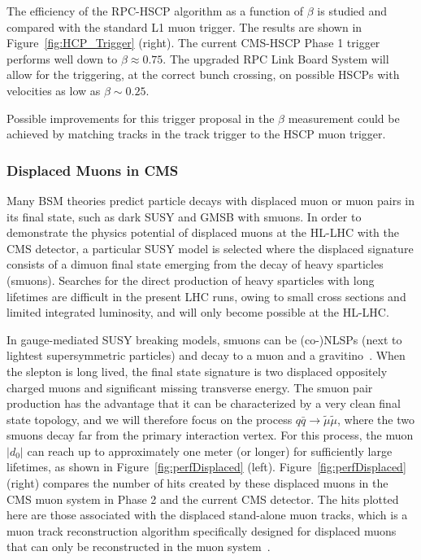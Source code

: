 The efficiency of the RPC-HSCP algorithm as a function of $\beta$ is studied and compared with the standard L1 muon trigger. The results are shown in Figure~\ref{fig:HCP_Trigger} (right). The current CMS-HSCP Phase 1 trigger performs well down to $\beta \approx 0.75$. The upgraded RPC Link Board System will allow for the triggering, at the
correct bunch crossing, on possible HSCPs with velocities as low as $\beta \sim 0.25$.

Possible improvements for this trigger proposal in the $\beta$ measurement could be achieved by matching tracks in the track trigger to the HSCP muon trigger.

\subsubsection{Displaced Muons in CMS}


Many BSM theories predict particle decays with displaced muon or muon pairs in its final state, such as dark SUSY and GMSB with smuons.
In order to demonstrate the physics potential of displaced muons at the HL-LHC with the CMS detector,
a particular SUSY model is selected where the displaced signature consists of a dimuon final state emerging from the decay of heavy sparticles (smuons).
Searches for the direct production of heavy sparticles with long lifetimes are difficult in the present LHC runs,
owing to small cross sections and limited integrated luminosity, and will only become possible at the HL-LHC.

In gauge-mediated SUSY breaking models, smuons can be (co-)NLSPs (next to lightest supersymmetric particles) and decay to a muon and a gravitino~\cite{Ruderman:2010kj}.
When the slepton is long lived, the final state signature is two displaced oppositely charged muons and significant missing transverse energy.
The smuon pair production has the advantage that it can be characterized by a very clean final state topology, and
we will therefore focus on the process $q \bar q \to \widetilde{\mu} \widetilde{\mu}$, where the two smuons decay far from the primary interaction vertex.
For this process, the muon $|d_0|$ can reach up to approximately one meter (or longer) for sufficiently large lifetimes,
as shown in Figure~\ref{fig:perfDisplaced} (left). Figure~\ref{fig:perfDisplaced} (right)
compares the number of hits created by these displaced muons in the CMS muon system in Phase 2 and the current CMS detector.
The hits plotted here are those associated with the displaced stand-alone muon tracks, which is a muon track reconstruction
algorithm specifically designed for displaced muons that can only be reconstructed in the muon system~\cite{CMS-DP-2015-015}.


